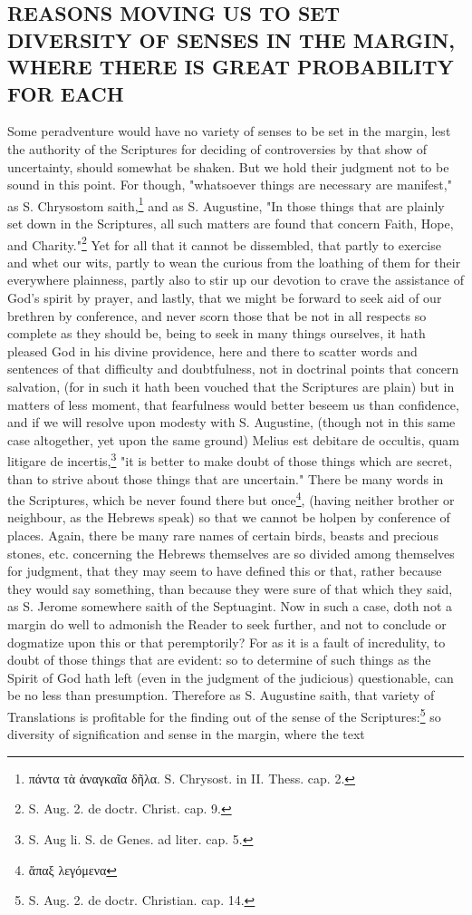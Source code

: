 \subsection{REASONS MOVING US TO SET DIVERSITY OF SENSES IN THE MARGIN, WHERE THERE IS GREAT PROBABILITY FOR EACH}

Some peradventure would have no variety of senses to be set in the margin, lest the authority of the Scriptures for deciding of controversies by that show of uncertainty, should somewhat be shaken. But we hold their judgment not to be sound in this point. For though, "whatsoever things are necessary are manifest," as S. Chrysostom saith,\footnote{\foreignlanguage{greek}{πάντα τὰ ἀναγκαῖα δῆλα}. S. Chrysost. in II. Thess. cap. 2.} and as S. Augustine, "In those things that are plainly set down in the Scriptures, all such matters are found that concern Faith, Hope, and Charity."\footnote{S. Aug. 2. de doctr. Christ. cap. 9.} Yet for all that it cannot be dissembled, that partly to exercise and whet our wits, partly to wean the curious from the loathing of them for their everywhere plainness, partly also to stir up our devotion to crave the assistance of God's spirit by prayer, and lastly, that we might be forward to seek aid of our brethren by conference, and never scorn those that be not in all respects so complete as they should be, being to seek in many things ourselves, it hath pleased God in his divine providence, here and there to scatter words and sentences of that difficulty and doubtfulness, not in doctrinal points that concern salvation, (for in such it hath been vouched that the Scriptures are plain) but in matters of less moment, that fearfulness would better beseem us than confidence, and if we will resolve upon modesty with S. Augustine, (though not in this same case altogether, yet upon the same ground) Melius est debitare de occultis, quam litigare de incertis,\footnote{S. Aug li. S. de Genes. ad liter. cap. 5.} "it is better to make doubt of those things which are secret, than to strive about those things that are uncertain." There be many words in the Scriptures, which be never found there but once\footnote{\foreignlanguage{greek}{ἅπαξ λεγόμενα}}, (having neither brother or neighbour, as the Hebrews speak) so that we cannot be holpen by conference of places. Again, there be many rare names of certain birds, beasts and precious stones, etc. concerning the Hebrews themselves are so divided among themselves for judgment, that they may seem to have defined this or that, rather because they would say something, than because they were sure of that which they said, as S. Jerome somewhere saith of the Septuagint. Now in such a case, doth not a margin do well to admonish the Reader to seek further, and not to conclude or dogmatize upon this or that peremptorily? For as it is a fault of incredulity, to doubt of those things that are evident: so to determine of such things as the Spirit of God hath left (even in the judgment of the judicious) questionable, can be no less than presumption. Therefore as S. Augustine saith, that variety of Translations is profitable for the finding out of the sense of the Scriptures:\footnote{S. Aug. 2. de doctr. Christian. cap. 14.} so diversity of signification and sense in the margin, where the text 